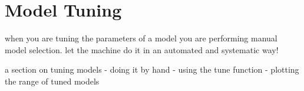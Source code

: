 

\section{Model Tuning} 
\label{advanced:tuning}

when you are tuning the parameters of a model you are performing manual model selection. let the machine do it in an automated and systematic way!

a section on tuning models
- doing it by hand
- using the tune function
- plotting the range of tuned models




